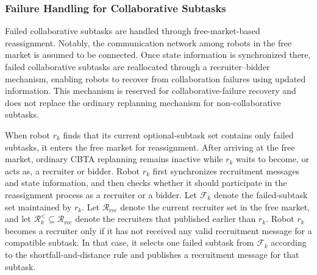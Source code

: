 \documentclass[lettersize,journal]{IEEEtran}
\begin{document}
\subsubsection{Failure Handling for Collaborative Subtasks}

Failed collaborative subtasks are handled through free-market-based reassignment. Notably, the communication network among robots in the free market is assumed to be connected. Once state information is synchronized there, failed collaborative subtasks are reallocated through a recruiter--bidder mechanism, enabling robots to recover from collaboration failures using updated information. This mechanism is reserved for collaborative-failure recovery and does not replace the ordinary replanning mechanism for non-collaborative subtasks.

When robot $r_k$ finds that its current optional-subtask set contains only failed subtasks, it enters the free market for reassignment. After arriving at the free market, ordinary CBTA replanning remains inactive while $r_k$ waits to become, or acts as, a recruiter or bidder. Robot $r_k$ first synchronizes recruitment messages and state information, and then checks whether it should participate in the reassignment process as a recruiter or a bidder. Let $\mathcal{F}_k$ denote the failed-subtask set maintained by $r_k$. Let $\mathcal{R}_{\mathrm{rec}}$ denote the current recruiter set in the free market, and let $\mathcal{R}^{<}_k \subseteq \mathcal{R}_{\mathrm{rec}}$ denote the recruiters that published earlier than $r_k$. Robot $r_k$ becomes a recruiter only if it has not received any valid recruitment message for a compatible subtask. In that case, it selects one failed subtask from $\mathcal{F}_k$ according to the shortfall-and-distance rule and publishes a recruitment message for that subtask.

\end{document}
